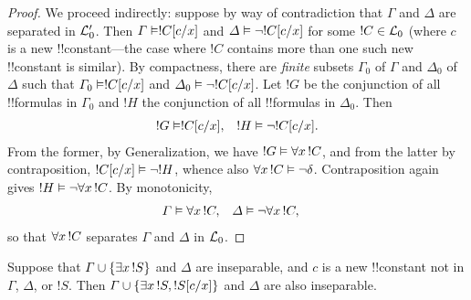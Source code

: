 \documentclass[../../../include/open-logic-section]{subfiles}
\begin{document}
\begin{proof}
We proceed indirectly: suppose by way of contradiction that $\Gamma$
and $\Delta$ are separated in $\Lang{L}'_0$. Then $\Gamma \Entails
\Subst{!C}{c}{x}$ and $\Delta \Entails \lnot \Subst{!C}{c}{x}$ for some $!C \in
\Lang{L}_0$ (where $c$ is a new !!{constant}---the case where $!C$
contains more than one such new !!{constant} is similar). By
compactness, there are \emph{finite} subsets $\Gamma_0$ of $\Gamma$
and $\Delta_0$ of $\Delta$ such that $\Gamma_0 \Entails \Subst{!C}{c}{x}$
and $\Delta_0 \Entails \lnot \Subst{!C}{c}{x}$. Let $!G$ be the
conjunction of all !!{formula}s in $\Gamma_0$ and $!H$ the
conjunction of all !!{formula}s in $\Delta_0$. Then
\begin{align*}
  !G & \Entails \Subst{!C}{c}{x}, & !H  \Entails \lnot \Subst{!C}{c}{x}.
\end{align*}
From the former, by Generalization, we have $!G \Entails
\lforall[x][!C]$, and from the latter by contraposition,
$\Subst{!C}{c}{x} \Entails \lnot !H$, whence also $\lforall[x][!C]
\Entails \lnot \delta$. Contraposition again gives $!H \Entails
\lnot \lforall[x][!C]$. By monotonicity,
\begin{align*}
  \Gamma &\Entails \lforall[x][!C], & 
  \Delta & \Entails \lnot \lforall[x][!C],
\end{align*}
so that $\lforall[x][!C]$ separates $\Gamma$ and $\Delta$ in
$\Lang{L}_0$. 
\end{proof}

\begin{lem}
Suppose that $\Gamma \cup \{ \lexists[x][!S] \}$ and $\Delta$ are
inseparable, and $c$ is a new !!{constant} not in $\Gamma$, $\Delta$,
or $!S$. Then $\Gamma \cup \{ \lexists[x][!S], \Subst{!S}{c}{x} \}$
and $\Delta$ are also inseparable.
\end{lem}
\end{document}
